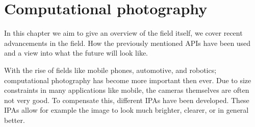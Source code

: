 \chapter{Computational photography\label{discussion}}
In this chapter we aim to give an overview of the field itself, we cover recent
advancements in the field. How the previously mentioned APIs have been used
and a view into what the future will look like.

With the rise of fields like mobile phones, automotive, and robotics;
computational photography has become more important then ever. Due to size
constraints in many applications like mobile, the cameras themselves are often
not very good. To compensate this, different IPAs have been developed. These
IPAs allow for example the image to look much brighter, clearer, or in general
better.
